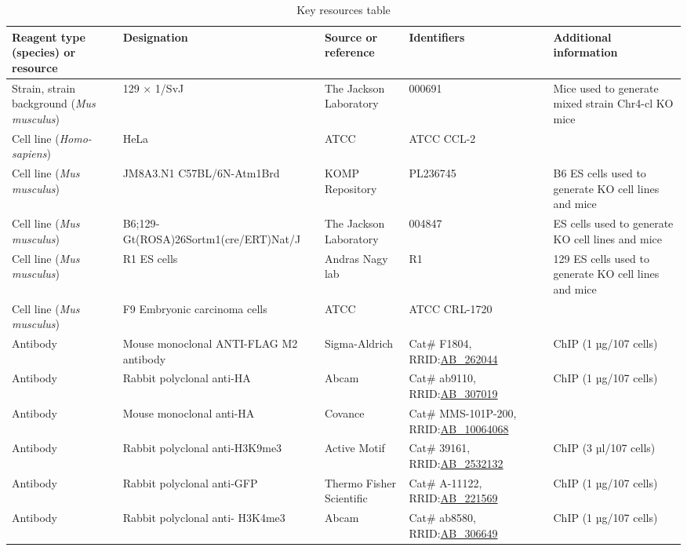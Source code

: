 \documentclass[11pt,a4paper]{article}
\begin{document}
\begin{table}[h]
\caption{Key resources table}
\begin{tabular}{|l|l|l|l|l|}
\hline
Reagent type (species) or resource & Designation & Source or reference & Identifiers & Additional information \\ \hline
Strain, strain background (\textit{Mus musculus}) & 129 × 1/SvJ & The Jackson Laboratory & 000691 & Mice used to generate mixed strain Chr4-cl KO mice \\ \hline
Cell line (\textit{Homo-sapiens}) & HeLa & ATCC & ATCC CCL-2 &  \\ \hline
Cell line (\textit{Mus musculus}) & JM8A3.N1 C57BL/6N-Atm1Brd & KOMP Repository & PL236745 & B6 ES cells used to generate KO cell lines and mice \\ \hline
Cell line (\textit{Mus musculus}) & B6;129‐ Gt(ROSA)26Sortm1(cre/ERT)Nat/J & The Jackson Laboratory & 004847 & ES cells used to generate KO cell lines and mice \\ \hline
Cell line (\textit{Mus musculus}) & R1 ES cells & Andras Nagy lab & R1 & 129 ES cells used to generate KO cell lines and mice \\ \hline
Cell line (\textit{Mus musculus}) & F9 Embryonic carcinoma cells & ATCC & ATCC CRL-1720 &  \\ \hline
Antibody & Mouse monoclonal ANTI-FLAG M2 antibody & Sigma-Aldrich & Cat\# F1804, RRID:\href{https://scicrunch.org/resolver/AB\_262044}{AB\_262044} & ChIP (1 µg/107 cells) \\ \hline
Antibody & Rabbit polyclonal anti-HA & Abcam & Cat\# ab9110, RRID:\href{https://scicrunch.org/resolver/AB\_307019}{AB\_307019} & ChIP (1 µg/107 cells) \\ \hline
Antibody & Mouse monoclonal anti-HA & Covance & Cat\# MMS-101P-200, RRID:\href{https://scicrunch.org/resolver/AB\_10064068}{AB\_10064068} &  \\ \hline
Antibody & Rabbit polyclonal anti-H3K9me3 & Active Motif & Cat\# 39161, RRID:\href{https://scicrunch.org/resolver/AB\_2532132}{AB\_2532132} & ChIP (3 µl/107 cells) \\ \hline
Antibody & Rabbit polyclonal anti-GFP & Thermo Fisher Scientific & Cat\# A-11122, RRID:\href{https://scicrunch.org/resolver/AB\_221569}{AB\_221569} & ChIP (1 µg/107 cells) \\ \hline
Antibody & Rabbit polyclonal anti- H3K4me3 & Abcam & Cat\# ab8580, RRID:\href{https://scicrunch.org/resolver/AB\_306649}{AB\_306649} & ChIP (1 µg/107 cells) \\ \hline

\end{tabular}
\end{table}
\end{document}
